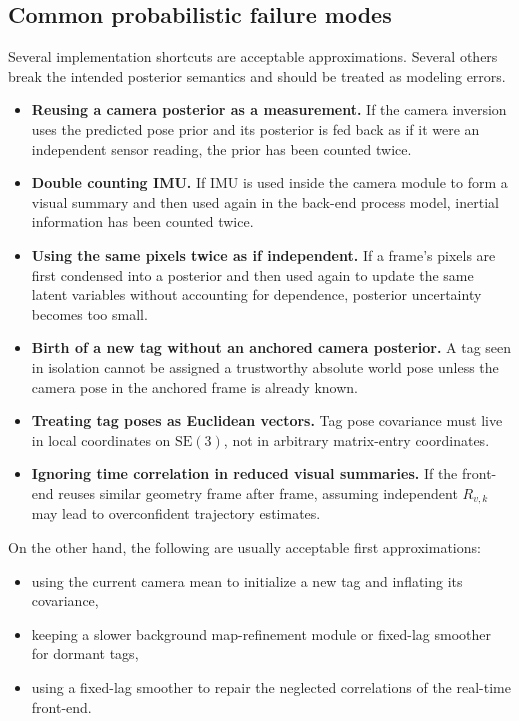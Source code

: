 \documentclass[11pt]{report}
\newcommand{\SE}{\mathrm{SE}(3)}
\begin{document}
\subsection{Common probabilistic failure modes}
Several implementation shortcuts are acceptable approximations. Several others break the intended posterior semantics and should be treated as modeling errors.
\begin{itemize}
    \item \textbf{Reusing a camera posterior as a measurement.} If the camera inversion uses the predicted pose prior and its posterior is fed back as if it were an independent sensor reading, the prior has been counted twice.
    \item \textbf{Double counting IMU.} If IMU is used inside the camera module to form a visual summary and then used again in the back-end process model, inertial information has been counted twice.
    \item \textbf{Using the same pixels twice as if independent.} If a frame's pixels are first condensed into a posterior and then used again to update the same latent variables without accounting for dependence, posterior uncertainty becomes too small.
    \item \textbf{Birth of a new tag without an anchored camera posterior.} A tag seen in isolation cannot be assigned a trustworthy absolute world pose unless the camera pose in the anchored frame is already known.
    \item \textbf{Treating tag poses as Euclidean vectors.} Tag pose covariance must live in local coordinates on $\SE$, not in arbitrary matrix-entry coordinates.
    \item \textbf{Ignoring time correlation in reduced visual summaries.} If the front-end reuses similar geometry frame after frame, assuming independent $R_{v,k}$ may lead to overconfident trajectory estimates.
\end{itemize}
On the other hand, the following are usually acceptable first approximations:
\begin{itemize}
    \item using the current camera mean to initialize a new tag and inflating its covariance,
    \item keeping a slower background map-refinement module or fixed-lag smoother for dormant tags,
    \item using a fixed-lag smoother to repair the neglected correlations of the real-time front-end.
\end{itemize}
\end{document}
